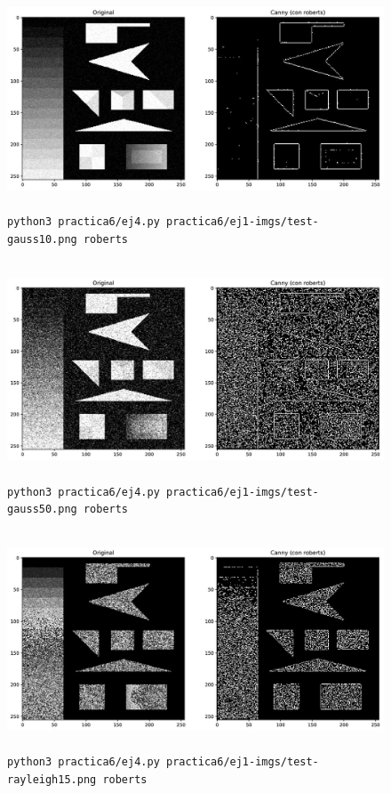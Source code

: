 \documentclass[11pt, spanish]{article}
\begin{document}
\begin{figure}[H]
\centering
    \includegraphics[height=6.5cm]{informe-imgs/ej4-roberts-test-gauss10.jpg}
    \caption{\texttt{python3 practica6/ej4.py practica6/ej1-imgs/test-gauss10.png roberts}}
\end{figure}

\begin{figure}[H]
\centering
    \includegraphics[height=6.5cm]{informe-imgs/ej4-roberts-test-gauss50.jpg}
    \caption{\texttt{python3 practica6/ej4.py practica6/ej1-imgs/test-gauss50.png roberts}}
\end{figure}

\begin{figure}[H]
\centering
    \includegraphics[height=6.5cm]{informe-imgs/ej4-roberts-test-rayleigh15.jpg}
    \caption{\texttt{python3 practica6/ej4.py practica6/ej1-imgs/test-rayleigh15.png roberts}}
\end{figure}
\end{document}
